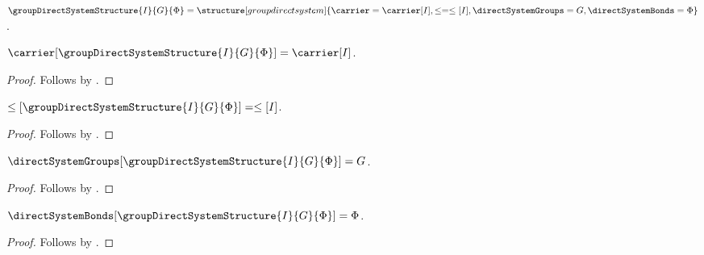 \begin{definition}\label{group_direct_system_structure}
    $\groupDirectSystemStructure{I}{G}{\Phi}=
        \structure[group direct system]{
            \carrier=\carrier[I],
            \leq=\leq[I],
            \directSystemGroups=G,
            \directSystemBonds=\Phi
        }$.
\end{definition}

\begin{proposition}\label{group_direct_system_structure_carrier}
    $\carrier[\groupDirectSystemStructure{I}{G}{\Phi}]=\carrier[I]$.
\end{proposition}
\begin{proof}
    Follows by .
\end{proof}

\begin{proposition}\label{group_direct_system_structure_order}
    $\leq[\groupDirectSystemStructure{I}{G}{\Phi}]=\leq[I]$.
\end{proposition}
\begin{proof}
    Follows by .
\end{proof}

\begin{proposition}\label{group_direct_system_structure_groups}
    $\directSystemGroups[\groupDirectSystemStructure{I}{G}{\Phi}]=G$.
\end{proposition}
\begin{proof}
    Follows by .
\end{proof}

\begin{proposition}\label{group_direct_system_structure_bonds}
    $\directSystemBonds[\groupDirectSystemStructure{I}{G}{\Phi}]=\Phi$.
\end{proposition}
\begin{proof}
    Follows by .
\end{proof}

